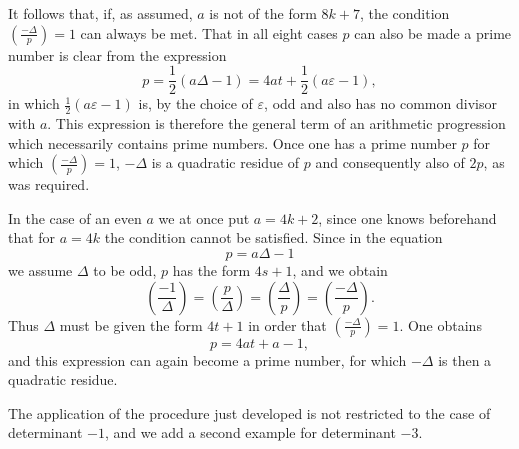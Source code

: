 \documentclass[11pt]{article}
\newcommand{\leg}[2]{\left(\frac{#1}{#2}\right)}
\begin{document}
It follows that, if, as assumed, $a$ is not of the form $8k+7$, the condition $\leg{-\Delta}{p}=1$ can always be met. That in all eight cases $p$ can also be made a prime number is clear from the expression
\[
 p=\frac12(a\Delta-1)=4at+\frac12(a\varepsilon-1),
\]
in which $\frac12(a\varepsilon-1)$ is, by the choice of $\varepsilon$, odd and also has no common divisor with $a$. This expression is therefore the general term of an arithmetic progression which necessarily contains prime numbers. Once one has a prime number $p$ for which $\leg{-\Delta}{p}=1$, $-\Delta$ is a quadratic residue of $p$ and consequently also of $2p$, as was required.

In the case of an even $a$ we at once put $a=4k+2$, since one knows beforehand that for $a=4k$ the condition cannot be satisfied. Since in the equation
\[
 p=a\Delta-1
\]
we assume $\Delta$ to be odd, $p$ has the form $4s+1$, and we obtain
\[
 \leg{-1}{\Delta}=\leg{p}{\Delta}=\leg{\Delta}{p}=\leg{-\Delta}{p}.
\]
Thus $\Delta$ must be given the form $4t+1$ in order that $\leg{-\Delta}{p}=1$. One obtains
\[
 p=4at+a-1,
\]
and this expression can again become a prime number, for which $-\Delta$ is then a quadratic residue.

The application of the procedure just developed is not restricted to the case of determinant $-1$, and we add a second example for determinant $-3$.
\end{document}
